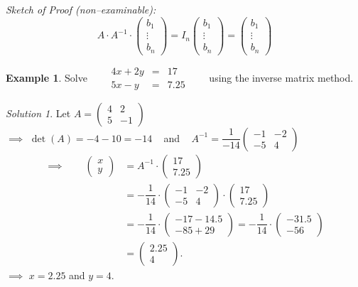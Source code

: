 \documentclass[
  english,
  12pt,
  oneside]{book}
\theoremstyle{definition}
\theoremstyle{definition}
\newtheorem{example}{Example}[chapter]
\theoremstyle{definition}
\theoremstyle{definition}
\theoremstyle{remark}
\newtheorem*{solution}{Solution}
\begin{document}
\emph{Sketch of Proof (non--examinable):}
\[A\cdot A^{-1}\cdot
\begin{pmatrix}b_1\\\vdots\\ b_n\end{pmatrix}
=
I_n
\begin{pmatrix}b_1\\\vdots\\ b_n\end{pmatrix}
=
\begin{pmatrix}b_1\\\vdots\\ b_n\end{pmatrix}\]

\begin{example}
Solve ~ ~ \(\begin{matrix}4x+2y &=& 17\\ 5x-y &=& 7.25\end{matrix}\) ~ ~ using the inverse matrix method.
\end{example}

\begin{solution}
Let \(A=\begin{pmatrix}4&2\\5&-1
\end{pmatrix}\)\\
\(\implies\) \(\det(A)=-4-10=-14\) ~ and ~ \(A^{-1}=\dfrac{1}{-14}\begin{pmatrix}-1&-2\\-5&4\end{pmatrix}\)
\begin{align*}
\implies\quad\quad
\begin{pmatrix}x\\y\end{pmatrix} &= A^{-1}\cdot \begin{pmatrix}17\\7.25\end{pmatrix}\\
&=-\dfrac{1}{14}\cdot\begin{pmatrix}-1&-2\\-5&4\end{pmatrix}\cdot \begin{pmatrix}17\\7.25\end{pmatrix}\\
&=-\dfrac{1}{14}\cdot\begin{pmatrix}-17-14.5\\-85+ 29\end{pmatrix} = -\dfrac{1}{14}\cdot\begin{pmatrix}-31.5\\-56\end{pmatrix}\\
&=\begin{pmatrix}2.25\\4\end{pmatrix}.
\end{align*}
\(\implies\) \(x=2.25\) and \(y=4\).
\end{solution}
\end{document}
